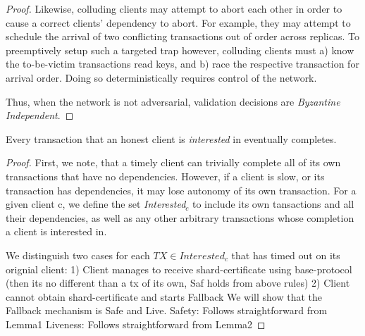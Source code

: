 {\begin{proof}
Likewise, colluding clients may attempt to abort each other in order to cause a correct clients' dependency to abort. For example, they may attempt to schedule the arrival of two conflicting transactions out of order across replicas. To preemptively setup such a targeted trap however, colluding clients must a) know the to-be-victim transactions read keys, and b) race the respective transaction for arrival order. Doing so deterministically requires control of the network.

Thus, when the network is not adversarial, validation decisions are \textit{Byzantine Independent}.



\end{proof}


\begin{theorem}[Liv] 
Every transaction that an honest client is \textit{interested} in eventually completes.
\end{theorem}

\begin{proof}
First, we note, that a timely client can trivially complete all of its own transactions that have no dependencies. However, if a client is slow, or its transaction has dependencies, it may lose autonomy of its own transaction. For a given client c, we define the set \textit{Interested$_c$} to include its own tansactions and all their dependencies, as well as any other arbitrary transactions whose completion a client is interested in. 

We distinguish two cases for each $TX \in Interested_c$ that has timed out on its orignial client: 
1) Client manages to receive shard-certificate using base-protocol (then its no different than a tx of its own, Saf holds from above rules)
2) Client cannot obtain shard-certificate and starts Fallback
We will show that the Fallback mechanism is Safe and Live.
Safety: Follows straightforward from Lemma1
Liveness: Follows straightforward from Lemma2




\end{proof}}
